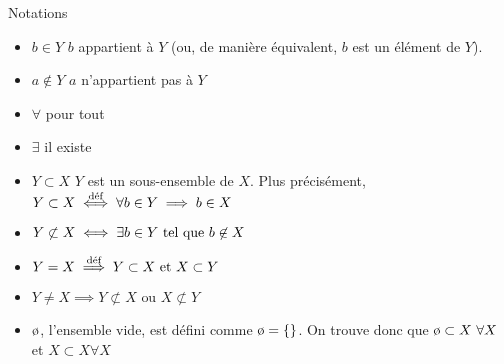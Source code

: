 \documentclass{article}
\begin{document}
\begin{parag}{Notations}
    \begin{itemize}[left=0pt]
        \item $b \in Y$ \textleftrightarrow $b$ appartient à $Y$ (ou, de manière équivalent, $b$ est un élément de $Y$).
        \item $a \not\in Y$ \textleftrightarrow $a$ n'appartient pas à $Y$
        \item $\forall$ \textleftrightarrow pour tout
        \item $\exists$ \textleftrightarrow il existe
        \item $Y \subset X$ \textleftrightarrow $Y$ est un sous-ensemble de $X$. Plus précisément, $Y \subset X \over{\iff}{\text{déf}} \forall b \in Y \implies b \in X$
        \item $Y \not \subset X \iff \exists b \in Y \telque b \not \in X$
        \item $Y = X \over{\implies}{\text{déf}} Y \subset X \text{ et } X \subset Y$
        \item $Y \neq X \implies Y \not \subset X \text{ ou } X \not \subset Y$
        \item $\o$, l'ensemble vide, est défini comme $\o = \left\{\right\}$. On trouve donc que $\o \subset X\ \forall X$ et $X \subset X \forall X$
    \end{itemize}
\end{parag}
\end{document}
